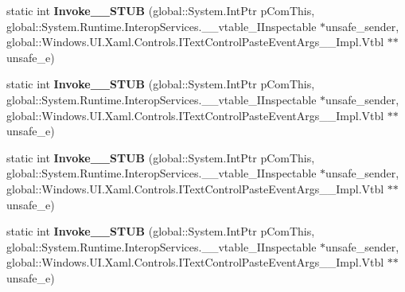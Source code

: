 \begin{DoxyCompactItemize}
\item 
\mbox{\label{struct_windows_1_1_u_i_1_1_xaml_1_1_controls_1_1_text_control_paste_event_handler_____impl_1_1_vtbl_af937f1205a9d6639a2cba47e2dd21354}} 
static int {\bfseries Invoke\+\_\+\+\_\+\+S\+T\+UB} (global\+::\+System.\+Int\+Ptr p\+Com\+This, global\+::\+System.\+Runtime.\+Interop\+Services.\+\_\+\+\_\+vtable\+\_\+\+I\+Inspectable $\ast$unsafe\+\_\+sender, global\+::\+Windows.\+U\+I.\+Xaml.\+Controls.\+I\+Text\+Control\+Paste\+Event\+Args\+\_\+\+\_\+\+Impl.\+Vtbl $\ast$$\ast$unsafe\+\_\+e)
\item 
\mbox{\label{struct_windows_1_1_u_i_1_1_xaml_1_1_controls_1_1_text_control_paste_event_handler_____impl_1_1_vtbl_af937f1205a9d6639a2cba47e2dd21354}} 
static int {\bfseries Invoke\+\_\+\+\_\+\+S\+T\+UB} (global\+::\+System.\+Int\+Ptr p\+Com\+This, global\+::\+System.\+Runtime.\+Interop\+Services.\+\_\+\+\_\+vtable\+\_\+\+I\+Inspectable $\ast$unsafe\+\_\+sender, global\+::\+Windows.\+U\+I.\+Xaml.\+Controls.\+I\+Text\+Control\+Paste\+Event\+Args\+\_\+\+\_\+\+Impl.\+Vtbl $\ast$$\ast$unsafe\+\_\+e)
\item 
\mbox{\label{struct_windows_1_1_u_i_1_1_xaml_1_1_controls_1_1_text_control_paste_event_handler_____impl_1_1_vtbl_af937f1205a9d6639a2cba47e2dd21354}} 
static int {\bfseries Invoke\+\_\+\+\_\+\+S\+T\+UB} (global\+::\+System.\+Int\+Ptr p\+Com\+This, global\+::\+System.\+Runtime.\+Interop\+Services.\+\_\+\+\_\+vtable\+\_\+\+I\+Inspectable $\ast$unsafe\+\_\+sender, global\+::\+Windows.\+U\+I.\+Xaml.\+Controls.\+I\+Text\+Control\+Paste\+Event\+Args\+\_\+\+\_\+\+Impl.\+Vtbl $\ast$$\ast$unsafe\+\_\+e)
\item 
\mbox{\label{struct_windows_1_1_u_i_1_1_xaml_1_1_controls_1_1_text_control_paste_event_handler_____impl_1_1_vtbl_af937f1205a9d6639a2cba47e2dd21354}} 
static int {\bfseries Invoke\+\_\+\+\_\+\+S\+T\+UB} (global\+::\+System.\+Int\+Ptr p\+Com\+This, global\+::\+System.\+Runtime.\+Interop\+Services.\+\_\+\+\_\+vtable\+\_\+\+I\+Inspectable $\ast$unsafe\+\_\+sender, global\+::\+Windows.\+U\+I.\+Xaml.\+Controls.\+I\+Text\+Control\+Paste\+Event\+Args\+\_\+\+\_\+\+Impl.\+Vtbl $\ast$$\ast$unsafe\+\_\+e)

\end{DoxyCompactItemize}
